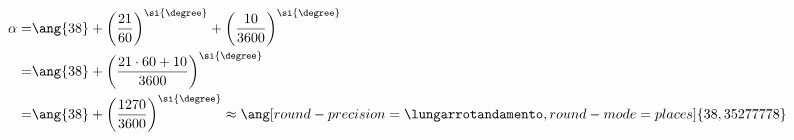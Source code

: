   	\begin{align*}
  	\alpha=&\ang{38}+\left(\dfrac{21}{60}\right)^{\si{\degree} }+\left(\dfrac{10}{3600}\right)^{\si{\degree} }\\
  	=&\ang{38}+\left(\dfrac{21\cdot60+10}{3600}\right)^{\si{\degree}}\\
  	=&\ang{38}+\left(\dfrac{1270}{3600}\right)^{\si{\degree}}\approx\ang[round-precision=\lungarrotandamento,round-mode=places]{38,35277778}
  	\end{align*}
  
